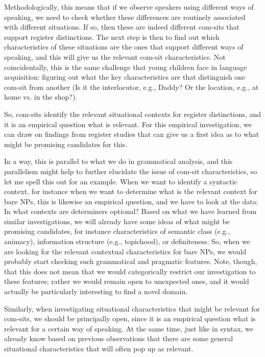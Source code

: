 Methodologically, this means that if we observe speakers using different ways of speaking, we need to check whether these differences are routinely associated with different situations. If so, then these are indeed different com-sits that support register distinctions. The next step is then to find out which characteristics of these situations are the ones that support different ways of speaking, and this will give us the relevant com-sit characteristics. Not coincidentally, this is the same challenge that young children face in language acquisition: figuring out what the key characteristics are that distinguish one com-sit from another (Is it the interlocutor, e.g., Daddy? Or the location, e.g., at home vs. in the shop?).

So, com-sits identify the relevant situational contexts for register distinctions, and it is an empirical question what is relevant. For this empirical investigation, we can draw on findings from register studies that can give us a first idea as to what might be promising candidates for this.

In a way, this is parallel to what we do in grammatical analysis, and this parallelism might help to further elucidate the issue of com-sit characteristics, so let me spell this out for an example. When we want to identify a syntactic context, for instance when we want to determine what is the relevant context for bare NPs, this is likewise an empirical question, and we have to look at the data: In what contexts are determiners optional? Based on what we have learned from similar investigations, we will already have some ideas of what might be promising candidates, for instance characteristics of semantic class (e.g., animacy), information structure (e.g., topichood), or definiteness. So, when we are looking for the relevant contextual characteristics for bare NPs, we would probably start checking such grammatical and pragmatic features. Note, though, that this does not mean that we would categorically restrict our investigation to these features; rather we would remain open to unexpected ones, and it would actually be particularly interesting to find a novel domain.

Similarly, when investigating situational characteristics that might be relevant for com-sits, we should be principally open, since it is an empirical question what is relevant for a certain way of speaking. At the same time, just like in syntax, we already know based on previous observations that there are some general situational characteristics that will often pop up as relevant.

